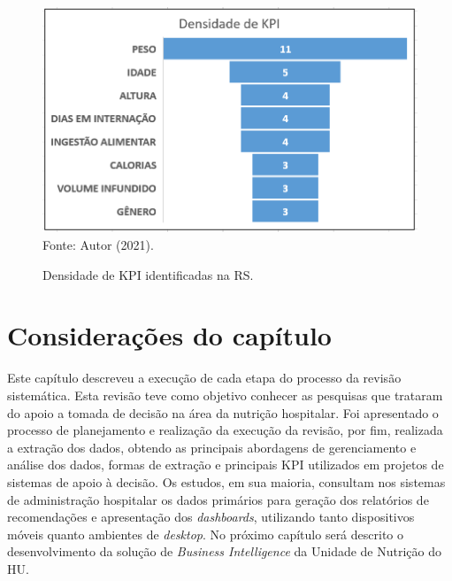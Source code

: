 \begin{figure}[htb]
	\caption{\label{fig_graficoDensidadeKPI}Densidade de KPI identificadas na RS.}
	\begin{center}
	    \includegraphics[scale=0.442]{Imagens/grafico - densidade de kpi.png} \\
	    Fonte: Autor (2021).
	\end{center}
\end{figure}

\section{Considerações do capítulo}
Este capítulo descreveu a execução de cada etapa do processo da revisão sistemática. Esta revisão teve como objetivo conhecer as pesquisas que trataram do apoio a tomada de decisão na área da nutrição hospitalar. Foi apresentado o processo de planejamento e realização da execução da revisão, por fim, realizada a extração dos dados, obtendo as principais abordagens de gerenciamento e análise dos dados, formas de extração e principais KPI utilizados em projetos de sistemas de apoio à decisão. Os estudos, em sua maioria, consultam nos sistemas de administração hospitalar os dados primários para geração dos relatórios de recomendações e apresentação dos \textit{dashboards}, utilizando tanto dispositivos móveis quanto ambientes de \textit{desktop}. No próximo capítulo será descrito o desenvolvimento da solução de \textit{Business Intelligence} da Unidade de Nutrição do HU.